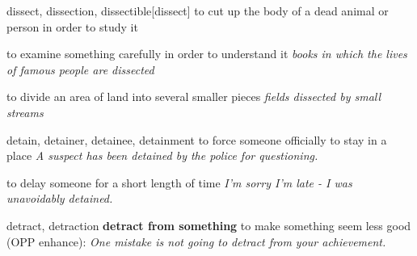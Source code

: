 \begin{word}{dissect, dissection, dissectible}[dissect]
    to cut up the body of a dead animal or person in order to study it

    to examine something carefully in order to understand it
    \textit{books in which the lives of famous people are dissected}

    to divide an area of land into several smaller pieces
    \textit{fields dissected by small streams}
\end{word}

\begin{word}{detain, detainer, detainee, detainment}
    to force someone officially to stay in a place
    \textit{A suspect has been detained by the police for questioning.}

    to delay someone for a short length of time
\textit{I'm sorry I'm late - I was unavoidably detained.}
\end{word}

\begin{word}{detract, detraction}
    \textbf{detract from something}
    to make something seem less good (OPP  enhance):
    \textit{One mistake is not going to detract from your achievement.}
\end{word}
